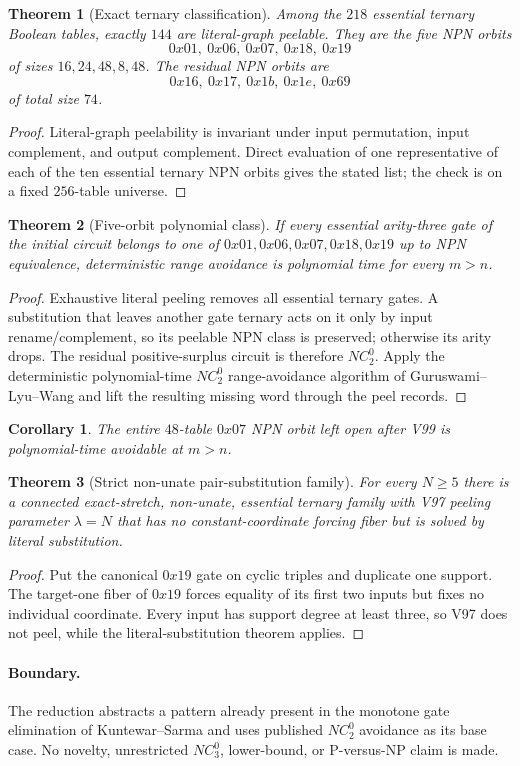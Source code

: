 \documentclass[11pt]{article}
\newtheorem{theorem}{Theorem}
\newtheorem{corollary}{Corollary}
\begin{document}
\begin{theorem}[Exact ternary classification]
Among the $218$ essential ternary Boolean tables, exactly $144$ are
literal-graph peelable. They are the five NPN orbits
\[
0x01,\ 0x06,\ 0x07,\ 0x18,\ 0x19
\]
of sizes $16,24,48,8,48$. The residual NPN orbits are
\[
0x16,\ 0x17,\ 0x1b,\ 0x1e,\ 0x69
\]
of total size $74$.
\end{theorem}
\begin{proof}
Literal-graph peelability is invariant under input permutation, input
complement, and output complement. Direct evaluation of one representative of
each of the ten essential ternary NPN orbits gives the stated list; the check is
on a fixed $256$-table universe.
\end{proof}

\begin{theorem}[Five-orbit polynomial class]
If every essential arity-three gate of the initial circuit belongs to one of
$0x01,0x06,0x07,0x18,0x19$ up to NPN equivalence, deterministic range avoidance
is polynomial time for every $m>n$.
\end{theorem}
\begin{proof}
Exhaustive literal peeling removes all essential ternary gates. A substitution
that leaves another gate ternary acts on it only by input rename/complement, so
its peelable NPN class is preserved; otherwise its arity drops. The residual
positive-surplus circuit is therefore $NC^0_2$. Apply the deterministic
polynomial-time $NC^0_2$ range-avoidance algorithm of
Guruswami--Lyu--Wang and lift the resulting missing word through the peel
records.
\end{proof}

\begin{corollary}
The entire $48$-table $0x07$ NPN orbit left open after V99 is polynomial-time
avoidable at $m>n$.
\end{corollary}

\begin{theorem}[Strict non-unate pair-substitution family]
For every $N\ge5$ there is a connected exact-stretch, non-unate, essential
ternary family with V97 peeling parameter $\lambda=N$ that has no
constant-coordinate forcing fiber but is solved by literal substitution.
\end{theorem}
\begin{proof}
Put the canonical $0x19$ gate on cyclic triples and duplicate one support. The
target-one fiber of $0x19$ forces equality of its first two inputs but fixes no
individual coordinate. Every input has support degree at least three, so V97
does not peel, while the literal-substitution theorem applies.
\end{proof}

\paragraph{Boundary.}
The reduction abstracts a pattern already present in the monotone gate
elimination of Kuntewar--Sarma and uses published $NC^0_2$ avoidance as its
base case. No novelty, unrestricted $NC^0_3$, lower-bound, or P-versus-NP claim
is made.
\end{document}
